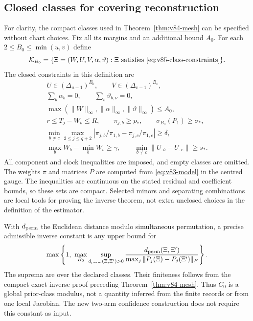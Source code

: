 \subsection{Closed classes for covering reconstruction}
For clarity, the compact classes used in
Theorem~\ref{thm:v84-mesh} can be specified without chart choices.
Fix all its margins and an additional bound $A_0$. For each
$2\le B_0\le\min(u,v)$ define
\begin{equation}\label{eq:v85-closed-covering-class}
 \mathcal K_{B_0}=\{\Xi=(W,U,V,\alpha,\vartheta):
                          \Xi\text{ satisfies }\eqref{eq:v85-class-constraints}\}.
\end{equation}
The closed constraints in this definition are
\begin{equation}\label{eq:v85-class-constraints}
\begin{gathered}
 U\in(\Delta_{u-1})^{B_0},\qquad V\in(\Delta_{v-1})^{B_0},\\
 \sum_b\alpha_b=0,\qquad \sum_b\vartheta_{b,\nu}=0,\\
 \max(\|W\|_\infty,\|\alpha\|_\infty,
                           \|\vartheta\|_\infty)\le A_0,\\
 r\le T_j-W_b\le R,\qquad \pi_{j,b}\ge p_*,\qquad
                         \sigma_{B_0}(P_1)\ge\sigma_*,\\
 \min_{b\ne c}\max_{2\le j\le q+2}
       |\pi_{j,b}/\pi_{1,b}-\pi_{j,c}/\pi_{1,c}|\ge\delta,\\
 \max_bW_b-\min_bW_b\ge\gamma,\qquad
                  \min_{b\ne c}\|U_{:b}-U_{:c}\|\ge s_*.
\end{gathered}
\end{equation}
All component and clock inequalities are imposed, and empty classes
are omitted. The weights $\pi$ and matrices $P$ are computed from
\eqref{eq:v83-model} in the centred gauge. The inequalities are
continuous on the stated residual and coefficient bounds, so these
sets are compact. Selected minors and separating combinations are
local tools for proving the inverse theorem, not extra unclosed
choices in the definition of the estimator.

With $d_{\rm perm}$ the Euclidean distance modulo simultaneous
permutation, a precise admissible inverse constant is any upper bound
for
\begin{equation}\label{eq:v85-C0}
 \max\left\{1,\ \max_{B_0}\sup_{d_{\rm perm}(\Xi,\Xi')>0}
   \frac{d_{\rm perm}(\Xi,\Xi')}
        {\max_j\|P_j(\Xi)-P_j(\Xi')\|_F}\right\}.
\end{equation}
The suprema are over the declared classes. Their finiteness follows
from the compact exact inverse proof preceding
Theorem~\ref{thm:v84-mesh}. Thus $C_0$ is a global prior-class
modulus, not a quantity inferred from the finite records or from one
local Jacobian. The new two-arm confidence construction does not
require this constant as input.


